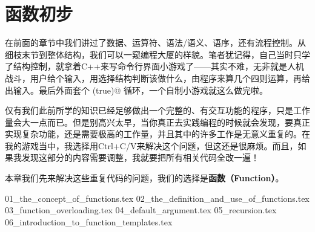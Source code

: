 \chapter{函数初步}
在前面的章节中我们讲过了数据、运算符、语法/语义、语序，还有流程控制。从细枝末节到整体结构，我们可以一窥编程大厦的样貌。笔者犹记得，自己当时只学了结构控制，就拿着C++来写命令行界面小游戏了——其实不难，无非就是人机战斗，用户给个输入，用选择结构判断该做什么，由程序来算几个四则运算，再给出输入。最后外面套个 \lstinline@while(true)@ 循环，一个自制小游戏就这么做完啦。\par
仅有我们此前所学的知识已经足够做出一个完整的、有交互功能的程序，只是工作量会大一点而已。但是别高兴太早，当你真正去实践编程的时候就会发现，要真正实现复杂功能，还是需要极高的工作量，并且其中的许多工作是无意义重复的。在我的游戏当中，我选择用Ctrl+C/V来解决这个问题，但这还是很麻烦。而且，如果我发现这部分的内容需要调整，我就要把所有相关代码全改一遍！\par
本章我们先来解决这些重复代码的问题，我们的选择是\textbf{函数（Function）}。\par
{01_the_concept_of_functions.tex}
{02_the_definition_and_use_of_functions.tex}
{03_function_overloading.tex}
{04_default_argument.tex}
{05_recursion.tex}
{06_introduction_to_function_templates.tex}
